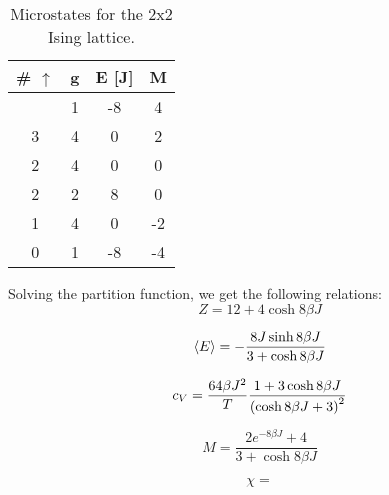 \begin{table}[htbp]
	\centering
	\begin{tabular}{cccc}
		\# $\uparrow$ & g & E [J] & M \\
		\hline
		\addlinespace[0.1cm]
		4                   & 1          & -8    & 4             \\
		3                   & 4          & 0      & 2             \\
		2                   & 4          & 0      & 0             \\
		2                   & 2          & 8     & 0             \\
		1                   & 4          & 0      & -2            \\
		0                   & 1          & -8    & -4           
	\end{tabular}
	\caption{Microstates for the 2x2 Ising lattice.}
	\label{table:analytic}
\end{table}

 Solving the partition function, we get the following relations:
  \begin{equation}
  \label{eq:analyticpartition}
    Z = 12 + 4\cosh{8\beta J}
  \end{equation}

  \begin{equation}
  \label{eq:analyticenergy}
    \expval{E} = -\frac{8J\sinh{8\beta J}}{3 + \cosh{8\beta J}}
  \end{equation}

  \begin{equation}
  \label{eq:analyticheatcap}
    c_V = \frac{64 \beta J^2}{T} \frac{1 + 3\cosh{8 \beta J}}{\qty(\cosh{8\beta J} + 3)^2}
  \end{equation}

  \begin{equation}
  \label{analyticmagnet}
    M = \frac{2e^{-8 \beta J} + 4}{3 + \cosh{8 \beta J}}
  \end{equation}

  \begin{equation}
  \label{analyticsuscept}
    \chi =
  \end{equation}


